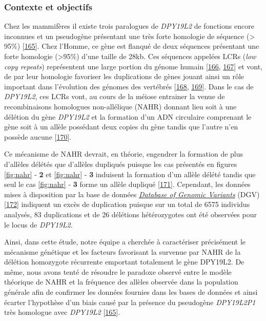 \documentclass[12pt,twoside]{reedthesis}
\theoremstyle{definition}
\theoremstyle{definition}
\theoremstyle{remark}
\begin{document}
  \subsubsection{Contexte et objectifs}\label{contexte-et-objectifs}
  
  Chez les mammifères il existe trois paralogues de \emph{DPY19L2} de
  fonctions encore inconnues et un pseudogène présentant une très forte
  homologie de séquence (\textgreater{} 95\%)
  {[}\protect\hyperlink{ref-Carson2006}{165}{]}. Chez l'Homme, ce gène est
  flanqué de deux séquences présentant une forte homologie
  (\textgreater{}95\%) d'une taille de 28kb. Ces séquences appelées LCRs
  (\emph{low copy repeats}) représentent une large portion du génome
  humain {[}\protect\hyperlink{ref-Cheung2003}{166},
  \protect\hyperlink{ref-Bailey2002}{167}{]} et vont, de par leur
  homologie favoriser les duplications de gènes jouant ainsi un rôle
  important dans l'évolution des génomes des vertébrés
  {[}\protect\hyperlink{ref-Walsh2003}{168},
  \protect\hyperlink{ref-Ohno1970}{169}{]}. Dans le cas de \emph{DPY19L2},
  ces LCRs vont, au cours de la méiose entrainer la venue de
  recombinaisons homologues non-allélique (NAHR) donnant lieu soit à une
  délétion du gène \emph{DPY19L2} et la formation d'un ADN circulaire
  comprenant le gène soit à un allèle possédant deux copies du gène tandis
  que l'autre n'en possède aucune
  {[}\protect\hyperlink{ref-Harbuz2011a}{170}{]}.
  
  Ce mécanisme de NAHR devrait, en théorie, engendrer la formation de plus
  d'allèles délétés que d'allèles dupliqués puisque les cas présentés en
  figures \ref{fig:nahr} - \textbf{2} et \ref{fig:nahr} - \textbf{3}
  induisent la formation d'un allèle délété tandis que seul le cas
  \ref{fig:nahr} - \textbf{3} forme un allèle dupliqué
  {[}\protect\hyperlink{ref-Liu2012}{171}{]}. Cependant, les données mises
  à disposition par la base de données
  \href{http://dgv.tcag.ca/dgv/app/home}{\emph{Database of Genomic
  Variants}} (DGV) {[}\protect\hyperlink{ref-MacDonald2014}{172}{]}
  indiquent un excès de duplication puisque sur un total de 6575 individus
  analysés, 83 duplications et de 26 délétions hétérozygotes ont été
  observées pour le locus de \emph{DPY19L2}.
  
  Ainsi, dans cette étude, notre équipe a cherchée à caractériser
  précisément le mécanisme génétique et les facteurs favorisant la
  survenue par NAHR de la délétion homozygote récurrente emportant
  totalement le gène DPY19L2. De même, nous avons tenté de résoudre le
  paradoxe observé entre le modèle théorique de NAHR et la fréquence des
  allèles observée dans la population générale afin de confirmer les
  données fournies dans les bases de données et ainsi écarter l'hypothèse
  d'un biais causé par la présence du pseudogène \emph{DPY19L2P1} très
  homologue avec \emph{DPY19L2}
  {[}\protect\hyperlink{ref-Carson2006}{165}{]}.
  
\end{document}
